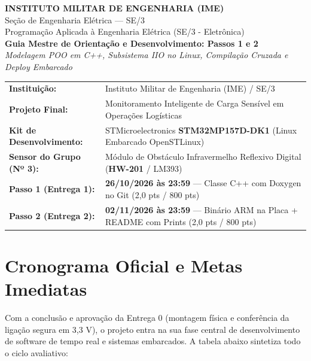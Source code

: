 \documentclass[11pt,a4paper]{article}
\begin{document}
\begin{center}
    {\Large \textbf{INSTITUTO MILITAR DE ENGENHARIA (IME)}}\\[0.15cm]
    {\large Seção de Engenharia Elétrica --- SE/3}\\[0.1cm]
    {\normalsize Programação Aplicada à Engenharia Elétrica (SE/3 - Eletrônica)}\\[0.25cm]
    {\Large \textbf{Guia Mestre de Orientação e Desenvolvimento: Passos 1 e 2}}\\[0.1cm]
    {\normalsize \textit{Modelagem POO em C++, Subsistema IIO no Linux, Compilação Cruzada e Deploy Embarcado}}\\[0.35cm]
    \begin{tabular}{lp{11.0cm}}
        \toprule
        \textbf{Instituição:} & Instituto Militar de Engenharia (IME) / SE/3 \\
        \textbf{Projeto Final:} & Monitoramento Inteligente de Carga Sensível em Operações Logísticas \\
        \textbf{Kit de Desenvolvimento:} & STMicroelectronics \textbf{STM32MP157D-DK1} (Linux Embarcado OpenSTLinux) \\
        \textbf{Sensor do Grupo (Nº 3):} & Módulo de Obstáculo Infravermelho Reflexivo Digital (\textbf{HW-201} / LM393) \\
        \textbf{Passo 1 (Entrega 1):} & \textbf{26/10/2026 às 23:59} --- Classe C++ com Doxygen no Git (2,0 pts / 800 pts) \\
        \textbf{Passo 2 (Entrega 2):} & \textbf{02/11/2026 às 23:59} --- Binário ARM na Placa + README com Prints (2,0 pts / 800 pts) \\
        \bottomrule
    \end{tabular}
\end{center}

\vspace{0.2cm}

\section{Cronograma Oficial e Metas Imediatas}

Com a conclusão e aprovação da Entrega 0 (montagem física e conferência da ligação segura em 3,3 V), o projeto entra na sua fase central de desenvolvimento de software de tempo real e sistemas embarcados. A tabela abaixo sintetiza todo o ciclo avaliativo:
\end{document}
